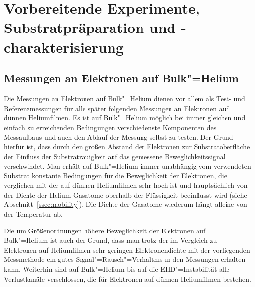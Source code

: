 \chapter{Vorbereitende Experimente, Substratpräparation und -charakterisierung}

\section{Messungen an Elektronen auf Bulk"=Helium}

Die Messungen an Elektronen auf Bulk"=Helium dienen vor allem als Test- und Referenzmessungen für alle später folgenden Messungen an Elektronen auf dünnen Heliumfilmen. Es ist auf Bulk"=Helium möglich bei immer gleichen und einfach zu erreichenden Bedingungen verschiedenste Komponenten des Mess\-aufbaus und auch den Ablauf der Messung selbst zu testen. Der Grund hierfür ist, dass durch den großen Abstand der Elektronen zur Substratoberfläche der Einfluss der Substratrauigkeit auf das gemessene Beweglichkeitssignal verschwindet. Man erhält auf Bulk"=Helium immer unabhängig vom verwendeten Substrat konstante Bedingungen für die Beweglichkeit der Elektronen, die verglichen mit der auf dünnen Heliumfilmen sehr hoch ist und hauptsächlich von der Dichte der Helium-Gasatome oberhalb der Flüssigkeit beeinflusst wird (siehe Abschnitt~\ref{ssec:mobility}). Die Dichte der Gasatome wiederum hängt alleine von der Temperatur ab.

Die um Größenordnungen höhere Beweglichkeit der Elektronen auf Bulk"=Helium ist auch der Grund, dass man trotz der im Vergleich zu Elektronen auf Heliumfilmen sehr geringen Elektronendichte mit der vorliegenden Messmethode ein gutes Signal"=Rausch"=Verhältnis in den Messungen erhalten kann. Weiterhin sind auf Bulk"=Helium bis auf die EHD"=Instabilität alle Verlustkanäle verschlossen, die für Elektronen auf dünnen Heliumfilmen bestehen.

